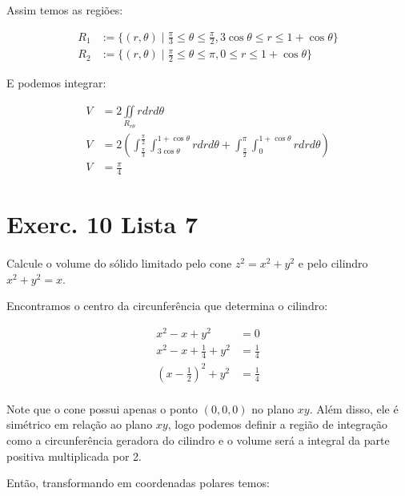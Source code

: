 \documentclass{article}
\newcommand{\doubleintp}[1] {\iint\limits_{R_{r\theta}} #1 r dr d\theta}
\begin{document}
        Assim temos as regiões:

        \begin{align*}
            R_1 &:= \{(r, \theta) \mid \frac{\pi}{3} \leq \theta \leq \frac{\pi}{2}, 3\cos{\theta} \leq r \leq 1 + \cos{\theta} \}\\
            R_2 &:= \{(r, \theta) \mid \frac{\pi}{2} \leq \theta \leq \pi, 0 \leq r \leq 1 + \cos{\theta} \}
        \end{align*}

        E podemos integrar:

        \begin{align*}
            V &= 2 \doubleintp{}\\
            V &= 2 \left( \int_{\frac{\pi}{3}}^{\frac{\pi}{2}} \int_{3 \cos{\theta}}^{1 + \cos{\theta}} r dr d\theta + \int_{\frac{\pi}{2}}^{\pi} \int_{0}^{1 + \cos{\theta}} r dr d\theta \right)\\
            V &= \frac{\pi}{4}
        \end{align*}

    \section{Exerc. 10 Lista 7}
        \paragraph{}
        Calcule o volume do sólido limitado pelo cone $z^2 = x^2 + y^2$ e pelo cilindro $x^2 + y^2 = x$.

        Encontramos o centro da circunferência que determina o cilindro:

        \begin{align*}
            x^2 - x + y^2 &= 0\\
            x^2 - x + \frac{1}{4} + y^2 &= \frac{1}{4}\\
            \left( x - \frac{1}{2} \right)^2 + y^2 &= \frac{1}{4}\\
        \end{align*}

        Note que o cone possui apenas o ponto $(0, 0, 0)$ no plano $xy$. Além disso,
        ele é simétrico em relação ao plano $xy$, logo podemos definir a região de
        integração como a circunferência geradora do cilindro e o volume será a integral
        da parte positiva multiplicada por 2.

        Então, transformando em coordenadas polares temos:
\end{document}

